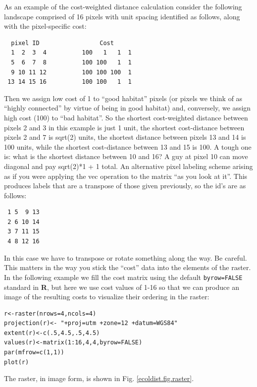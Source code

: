 As an example of the cost-weighted distance calculation consider the
following landscape comprised of 16 pixels with unit spacing 
identified as follows, along with the pixel-specific cost:
\begin{verbatim}
  pixel ID                 Cost
  1  2  3  4          100   1   1  1
  5  6  7  8          100 100   1  1
  9 10 11 12          100 100 100  1
 13 14 15 16          100 100   1  1 
\end{verbatim}
Then we assign low cost of 1 to ``good habitat'' pixels (or pixels we
think of as ``highly connected'' by virtue of being in good habitat)
and, conversely, we assign high cost (100) to ``bad habitat''. So the
shortest cost-weighted distance between pixels 2 and 3 in this example
is just 1 unit, the shortest cost-distance between pixels 2 and 7 is
sqrt(2) units, the shortest distance between pixels 13 and 14 is 100
units, while the shortest cost-distance between 13 and 15 is 100. A
tough one is: what is the shortest distance between 10 and 16? A guy at pixel
10 can move diagonal and pay sqrt(2)*1 + 1 total.
An alternative pixel labeling scheme arising as if you were applying
the vec operation to the matrix ``as you look at it''. This produces
labels that are a transpose of those given previously, so the id's are
as follows:
\begin{verbatim}
 1 5  9 13
 2 6 10 14
 3 7 11 15
 4 8 12 16
\end{verbatim}
In this case we have to transpose or rotate something along the way. 
Be careful. This matters in the way you stick the ``cost'' data into
the elements of the raster.
In the following example we fill the cost
matrix using the default \mbox{\tt byrow=FALSE} standard in {\bf
  R}, but here we use cost values of 1-16 so that we can produce an
image of the resulting costs to visualize their ordering in the raster:
\begin{verbatim}
r<-raster(nrows=4,ncols=4)
projection(r)<- "+proj=utm +zone=12 +datum=WGS84"
extent(r)<-c(.5,4.5,.5,4.5)
values(r)<-matrix(1:16,4,4,byrow=FALSE)
par(mfrow=c(1,1))
plot(r)
\end{verbatim}
The raster, in image form, is shown in Fig. \ref{ecoldist.fig.raster}.

